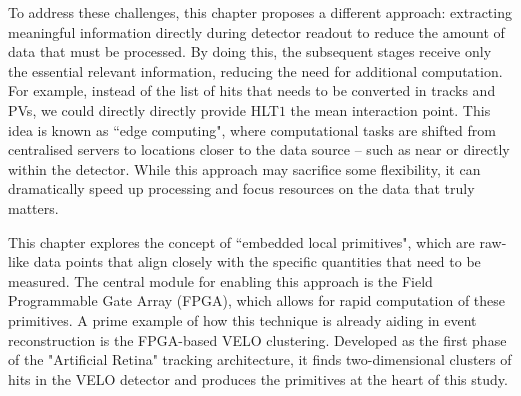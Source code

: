 To address these challenges, this chapter proposes a different approach: extracting meaningful information directly during detector readout to reduce the amount of data that must be processed. By doing this, the subsequent stages receive only the essential relevant information, reducing the need for additional computation. For example, instead of the list of hits that needs to be converted in tracks and PVs, we could directly directly provide HLT$1$ the mean interaction point. This idea is known as ``edge computing", where computational tasks are shifted from centralised servers to locations closer to the data source -- such as near or directly within the detector. While this approach may sacrifice some flexibility, it can dramatically speed up processing and focus resources on the data that truly matters.


This chapter explores the concept of ``embedded local primitives", which are raw-like data points that align closely with the specific quantities that need to be measured. The central module for enabling this approach is the Field Programmable Gate Array (FPGA), which allows for rapid computation of these primitives. A prime example of how this technique is already aiding in event reconstruction is the FPGA-based VELO clustering. Developed as the first phase of the "Artificial Retina" tracking architecture, it finds two-dimensional clusters of hits in the VELO detector and produces the primitives at the heart of this study.

